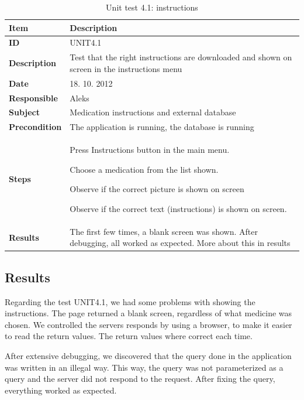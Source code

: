\begin{table}
	\begin{center}
		\begin{tabular}{|p{3.0cm}|p{14.0cm}|}
			\hline
			\bf{Item} & \bf{Description}\\
			\hline
			\bf{ID} & UNIT4.1\\
			\bf{Description} & Test that the right instructions are downloaded and shown on screen in the instructions menu\\
			\bf{Date} & 18. 10. 2012\\
			\bf{Responsible} & Aleks\\
			\bf{Subject} & Medication instructions and external database \\
			\bf{Precondition} & The application is running, the database is running\\
			\bf{Steps} &
			\begin{tabulenum}
			    \item Press Instructions button in the main menu.
			    \item Choose a medication from the list shown.
			    \item Observe if the correct picture is shown on screen
			    \item Observe if the correct text (instructions) is shown on screen.
			\end{tabulenum}\\
			\hline
			\bf{Results} & The first few times, a blank screen was shown. After debugging, all worked as expected. More about this in results\\
			\hline
		\end{tabular}
	\end{center}
	\caption{Unit test 4.1: instructions}
	\label{tab:unit4.1}
\end{table}

\subsection{Results}
Regarding the test UNIT4.1, we had some problems with showing the instructions. The page 
returned a blank screen, regardless of what medicine was chosen. We controlled the 
servers responds by using a browser, to make it easier to read the return values. The 
return values where correct each time.

After extensive debugging, we discovered that the query done in the application was 
written in an illegal way. This way, the query was not parameterized as a query and 
the server did not respond to the request. After fixing the query, everything worked as expected. 

